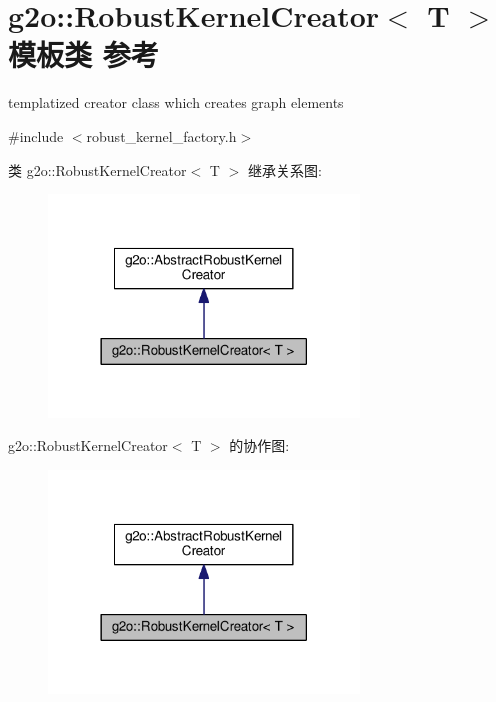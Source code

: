 \hypertarget{classg2o_1_1RobustKernelCreator}{\section{g2o\-:\-:Robust\-Kernel\-Creator$<$ T $>$ 模板类 参考}
\label{classg2o_1_1RobustKernelCreator}
}


templatized creator class which creates graph elements  




{\ttfamily \#include $<$robust\-\_\-kernel\-\_\-factory.\-h$>$}



类 g2o\-:\-:Robust\-Kernel\-Creator$<$ T $>$ 继承关系图\-:
\nopagebreak
\begin{figure}[H]
\begin{center}
\leavevmode
\includegraphics[width=234pt]{classg2o_1_1RobustKernelCreator__inherit__graph}
\end{center}
\end{figure}


g2o\-:\-:Robust\-Kernel\-Creator$<$ T $>$ 的协作图\-:
\nopagebreak
\begin{figure}[H]
\begin{center}
\leavevmode
\includegraphics[width=234pt]{classg2o_1_1RobustKernelCreator__coll__graph}
\end{center}
\end{figure}
